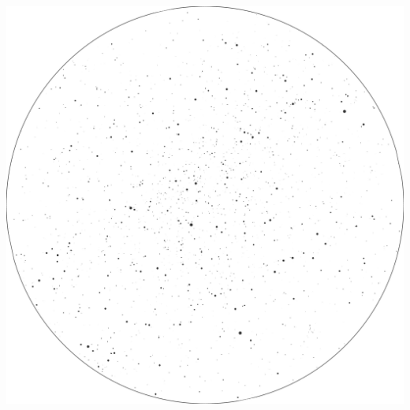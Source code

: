\documentclass{./SAS-class-skygen}
\begin{document}
	\vspace{0.5cm}
    \begin{center}
    \includegraphics[width=\textwidth]{./pics/skychart31.png}
    \end{center}
    
    
\end{document}
